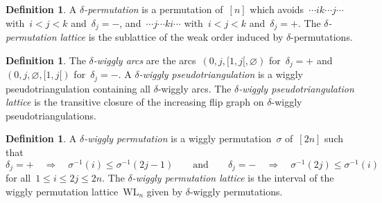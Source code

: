 \documentclass{amsart}
\theoremstyle{definition}
\newtheorem{definition}[theorem]{Definition}
\renewcommand{\implies}{\Rightarrow} %
\newcommand{\darkblue}{\color{darkblue}} %
\newcommand{\defn}[1]{\textsl{\darkblue #1}} %
\newcommand{\wigglyLattice}{\mathrm{WL}} %
\begin{document}
\begin{definition}
\label{def:CambrianPermutations}
A \defn{$\delta$-permutation} is a permutation of~$[n]$ which avoids~$\cdots ik \cdots j \cdots$ with~$i < j < k$ and~$\delta_j = -$, and~$\cdots j \cdots ki \cdots$ with~$i < j < k$ and~$\delta_j = +$.
The \defn{$\delta$-permutation lattice} is the sublattice of the weak order induced by $\delta$-permutations.
\end{definition}

\begin{definition}
\label{def:CambrianWigglyPseudotriangulations}
The \defn{$\delta$-wiggly arcs} are the arcs~$(0, j, {[1,j[}, \varnothing)$ for~$\delta_j = {+}$ and~$(0, j, \varnothing, {[1,j[})$ for~$\delta_j = {-}$.
A \defn{$\delta$-wiggly pseudotriangulation} is a wiggly pseudotriangulation containing all $\delta$-wiggly arcs.
The \defn{$\delta$-wiggly pseudotriangulation lattice} is the transitive closure of the increasing flip graph on $\delta$-wiggly pseudotriangulations.
\end{definition}

\begin{definition}
\label{def:CambrianWigglyPermutations}
A \defn{$\delta$-wiggly permutation} is a wiggly permutation~$\sigma$ of~$[2n]$ such that
\[
\delta_j = {+} \quad \Longrightarrow \quad \sigma^{-1}(i) \le \sigma^{-1}(2j-1)
\qquad\text{and}\qquad
\delta_j = {-} \quad \Longrightarrow \quad \sigma^{-1}(2j) \le \sigma^{-1}(i)
\]
for all~$1 \le i \le 2j \le 2n$.
The \defn{$\delta$-wiggly permutation lattice} is the interval of the wiggly permutation lattice~$\wigglyLattice_n$ given by $\delta$-wiggly permutations.
\end{definition}
\end{document}

